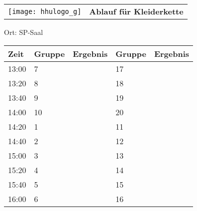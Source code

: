 \documentclass[a4paper,10pt]{article}
\def\spielg{Kleiderkette}
\def\raumg{SP-Saal}
\begin{document}
   \newpage
  \begin{tabularx}{\textwidth}{lc}
    \texttt{[image: hhulogo\_g]}
  & {\Huge \textbf{Ablauf für \spielg}}
  \end{tabularx}
  \LARGE
  \begin{center}
    \vspace{1cm} 
    Ort: \raumg
  \end{center}
    \vspace{2cm} 
    \begin{tabularx}{\textwidth}{X||X|X||X|X}
	\textbf{Zeit} &\textbf{Gruppe} & \textbf{Ergebnis} &\textbf{Gruppe} & \textbf{Ergebnis}  	\\ \hline \hline
	13:00 &	7	&	&17	&	\\ \hline
	13:20 &	8	&	&18	&	\\ \hline
	13:40 &	9	&	&19	&	\\ \hline

	14:00 &	10	&	&20	&	\\ \hline
	14:20 &	1	&	&11	&	\\ \hline
	14:40 &	2	&	&12	&	\\ \hline

	15:00 &	3	&	&13	&	\\ \hline
	15:20 &	4	&	&14	&	\\ \hline
	15:40 &	5	&	&15	&	\\ \hline

	16:00 &	6	&	&16	&	\\ \hline
      
    \end{tabularx}
   
\end{document}
